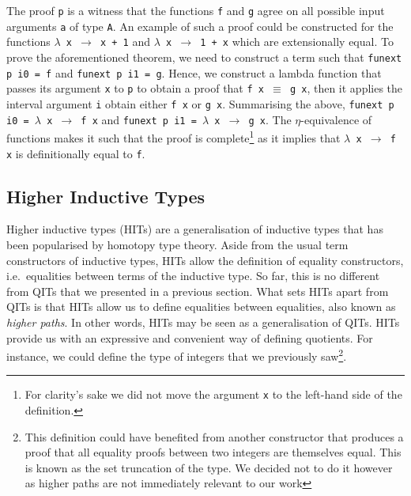 \documentclass[12pt,twoside,maitrise]{dms}
\theoremstyle{definition}
\numberwithin{equation}{section}
\numberwithin{table}{chapter}
\numberwithin{figure}{chapter}
\newcommand\id[1] {\texttt{#1}}
\newcommand\fn[1] {\texttt{#1}}
\begin{document}
The proof \id{p} is a witness that the functions \id{f} and \id{g} agree on all
possible input arguments \id{a} of type \id{A}. An example of such a proof could
be constructed for the functions \fn{$\lambda$ x $\rightarrow$ x + 1} and
\fn{$\lambda$ x $\rightarrow$ 1 + x} which are extensionally equal. To prove the
aforementioned theorem, we need to construct a term such that \fn{funext p i0 =
  f} and \fn{funext p i1 = g}. Hence, we construct a lambda function that passes
its argument \id{x} to \id{p} to obtain a proof that \fn{f x $\equiv$ g x}, then
it applies the interval argument \id{i} obtain either \fn{f x} or \fn{g x}.
Summarising the above, \fn{funext p i0 = $\lambda$ x $\rightarrow$ f x} and
\fn{funext p i1 = $\lambda$ x $\rightarrow$ g x}. The $\eta$-equivalence of
functions makes it such that the proof is complete\footnote{For clarity's sake
we did not move the argument \id{x} to the left-hand side of the definition.} as
it implies that \fn{$\lambda$ x $\rightarrow$ f x} is definitionally equal to
\id{f}.



\subsection{Higher Inductive Types}

Higher inductive types (HITs) are a generalisation of inductive types that has
been popularised by homotopy type theory\cite{HoTTbook}. Aside from the usual
term constructors of inductive types, HITs allow the definition of equality
constructors, i.e.\ equalities between terms of the inductive type. So far, this
is no different from QITs that we presented in a previous section. What sets
HITs apart from QITs is that HITs allow us to define equalities between
equalities, also known as \emph{higher paths}. In other words, HITs may be seen
as a generalisation of QITs. HITs provide us with an expressive and convenient
way of defining quotients. For instance, we could define the type of integers
that we previously saw\footnote{This definition could have benefited from
another constructor that produces a proof that all equality proofs between two
integers are themselves equal. This is known as the set truncation of the type.
We decided not to do it however as higher paths are not immediately relevant to
our work}.
\end{document}

